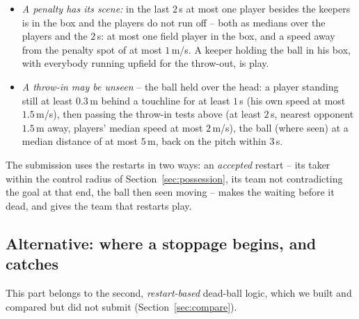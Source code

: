 \documentclass[11pt,a4paper]{article}
\begin{document}
{\begin{itemize}[leftmargin=1.2em]
  opponent of the taker was within $2$\,m of the ball. A player holding the ball in the
  build-up has the opponents far away all along.
\item \emph{A penalty has its scene:} in the last $2$\,s at most one player besides the
  keepers is in the box and the players do not run off -- both as medians over the players and the $2$\,s: at most one
  field player in the box, and a speed away from the penalty spot of at most $1$\,m/s. A keeper holding
  the ball in his box, with everybody running upfield for the throw-out, is play.
\item \emph{A throw-in may be unseen} -- the ball held over the head: a player standing still
  at least $0.3$\,m behind a touchline for at least $1$\,s (his own speed at most $1.5$\,m/s), then passing the throw-in tests above
  (at least $2$\,s, nearest opponent $1.5$\,m away, players' median speed at most $2$\,m/s), the ball (where seen) at a median distance of at most $5$\,m, back on the pitch within $3$\,s.
\end{itemize}
The submission uses the restarts in two ways: an \emph{accepted} restart -- its taker within the
control radius of Section~\ref{sec:possession}, its team not contradicting the goal at that end,
the ball then seen moving -- makes the waiting before it dead, and gives the team that restarts
play.}

\subsection{Alternative: where a stoppage begins, and catches}\label{sec:cut}

\noindent This part belongs to the second, \emph{restart-based} dead-ball logic, which we built and
compared but did not submit (Section~\ref{sec:compare}).
\end{document}
